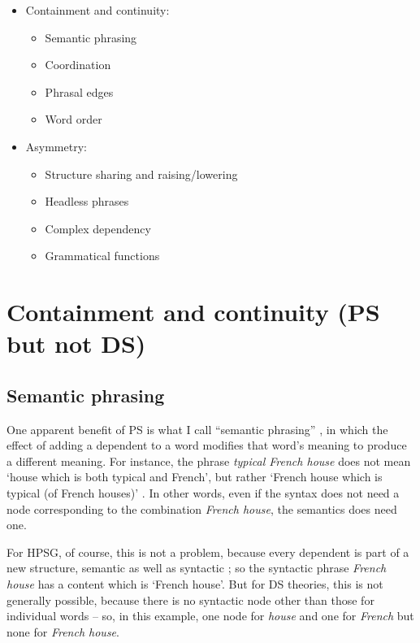 \documentclass[output=paper
	        ,collection
	        ,collectionchapter
 	        ,biblatex
                ,babelshorthands
                ,newtxmath
                ,draftmode
                ,colorlinks, citecolor=brown
]{langscibook}
\begin{document}
\begin{itemize}
	\item  Containment and continuity:
	\begin{itemize}
		\item Semantic phrasing
		
		\item Coordination
		
		\item Phrasal edges
		
		\item Word order
	\end{itemize}

	\item Asymmetry:
	\begin{itemize}
		\item Structure sharing and raising/lowering
		
		\item Headless phrases
		
		\item Complex dependency
		
		\item Grammatical functions
	\end{itemize}
\end{itemize}


\section{Containment and continuity (PS but not DS)}
\label{sec:4}

\subsection{Semantic phrasing}
\label{sec:4.1}

One apparent benefit of PS is what I call ``semantic phrasing'' \citep[146–151]{Hudson90a-u}, in which the effect of adding a dependent to a word modifies that word’s meaning to produce a different meaning. For instance, the phrase \emph{typical French house} does not mean ‘house which is both typical and French’, but rather ‘French house which is typical (of French houses)’ \citep{Dahl80a}. In other words, even if the syntax does not need a node corresponding to the combination \emph{French house}, the semantics does need one.

For HPSG, of course, this is not a problem, because every dependent is part of a new structure, semantic as well as syntactic \citep{MuellerEvaluating}; so the syntactic phrase \emph{French house} has a content which is ‘French house’. But for DS theories, this is not generally possible, because there is no syntactic node other than those for individual words – so, in this example, one node for \emph{house} and one for \emph{French} but none for \emph{French house}.
\end{document}
